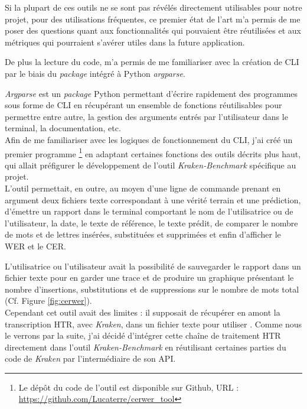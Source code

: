 Si la plupart de ces outils ne se sont pas révélés directement utilisables pour notre projet, pour des utilisations fréquentes, ce premier état de l'art m'a permis de me poser des questions quant aux fonctionnalités qui pouvaient être réutilisées et aux métriques qui pourraient s'avérer utiles dans la future application. 

De plus la lecture du code, m'a permis de me familiariser avec la création de CLI par le biais du \textit{package} intégré à Python \textit{argparse}. 

\textit{Argparse} est un \textit{package} Python permettant d'écrire rapidement des programmes sous forme de CLI en récupérant un ensemble de fonctions réutilisables pour permettre entre autre, la gestion des arguments entrés par l'utilisateur dans le terminal, la documentation, etc.\\

Afin de me familiariser avec les logiques de fonctionnement du CLI, j'ai créé un premier programme \footnote{Le dépôt du code de l'outil  est disponible sur Github, URL : \url{https://github.com/Lucaterre/cerwer_tool}} en adaptant certaines fonctions des outils décrits plus haut, qui allait préfigurer le développement de l'outil \textit{Kraken-Benchmark} spécifique au projet.\\

L'outil  permettait, en outre, au moyen d'une ligne de commande prenant en argument deux fichiers texte correspondant à une vérité terrain et une prédiction, d'émettre un rapport dans le terminal comportant le nom de l'utilisatrice ou de l'utilisateur, la date, le texte de référence, le texte prédit, de comparer le nombre de mots et de lettres insérées, substituées et supprimées et enfin d'afficher le WER et le CER.

L'utilisatrice ou l'utilisateur avait la possibilité de sauvegarder le rapport dans un fichier texte pour en garder une trace et de produire un graphique présentant le nombre d'insertions, substitutions et de suppressions sur le nombre de mots total (Cf. Figure \ref{fig:cerwer}).\\

Cependant cet outil avait des limites : il supposait de récupérer en amont la transcription HTR, avec \textit{Kraken}, dans un fichier texte pour utiliser . Comme nous le verrons par la suite, j'ai décidé d'intégrer cette chaîne de traitement HTR directement dans l'outil \textit{Kraken-Benchmark} en réutilisant certaines parties du code de \textit{Kraken} par l'intermédiaire de son API.

